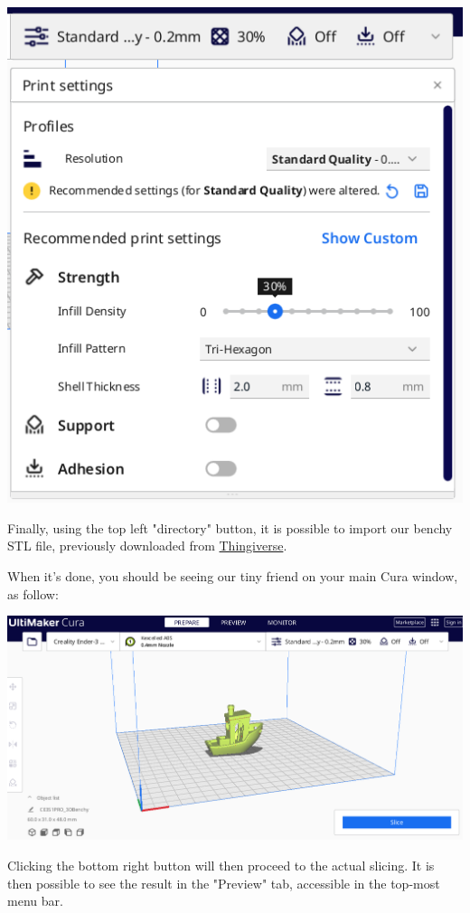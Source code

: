 \documentclass[a4paper,11pt]{article}
\begin{document}
\begin{center}
\includegraphics[width=.7\linewidth]{img/cura/8.png}
\end{center}

Finally, using the top left "directory" button, it is possible to import our benchy STL file, previously
downloaded from \href{https://www.thingiverse.com/thing:763622/files}{Thingiverse}.

When it's done, you should be seeing our tiny friend on your main Cura window, as follow:

\begin{center}
\includegraphics[width=1\linewidth]{img/cura/9.png}
\end{center}

Clicking the bottom right button will then proceed to the actual slicing.
It is then possible to see the result in the "Preview" tab, accessible in the top-most menu bar.
\end{document}
